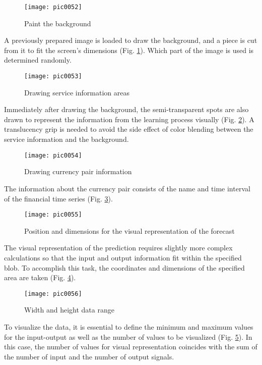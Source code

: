 \begin{figure}[h]
\centering
\texttt{[image: pic0052]}
\caption{Paint the background}
\label{fig:pic0052}
\end{figure}
\FloatBarrier

A previously prepared image is loaded to draw the background, and a piece is cut from it to fit the screen's dimensions (Fig. \ref{fig:pic0052}). Which part of the image is used is determined randomly.

\begin{figure}[h]
\centering
\texttt{[image: pic0053]}
\caption{Drawing service information areas}
\label{fig:pic0053}
\end{figure}
\FloatBarrier

Immediately after drawing the background, the semi-transparent spots are also drawn to represent the information from the learning process visually (Fig. \ref{fig:pic0053}). A translucency grip is needed to avoid the side effect of color blending between the service information and the background.

\begin{figure}[h]
\centering
\texttt{[image: pic0054]}
\caption{Drawing currency pair information}
\label{fig:pic0054}
\end{figure}
\FloatBarrier

The information about the currency pair consists of the name and time interval of the financial time series (Fig. \ref{fig:pic0054}).

\begin{figure}[h]
\centering
\texttt{[image: pic0055]}
\caption{Position and dimensions for the visual representation of the forecast}
\label{fig:pic0055}
\end{figure}
\FloatBarrier

The visual representation of the prediction requires slightly more complex calculations so that the input and output information fit within the specified blob. To accomplish this task, the coordinates and dimensions of the specified area are taken (Fig. \ref{fig:pic0055}).

\begin{figure}[h]
\centering
\texttt{[image: pic0056]}
\caption{Width and height data range}
\label{fig:pic0056}
\end{figure}
\FloatBarrier

To visualize the data, it is essential to define the minimum and maximum values for the input-output as well as the number of values to be visualized (Fig. \ref{fig:pic0056}). In this case, the number of values for visual representation coincides with the sum of the number of input and the number of output signals.

